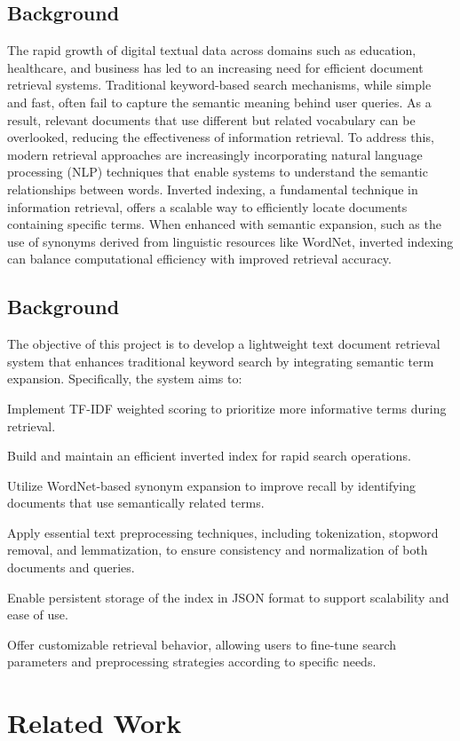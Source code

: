 \documentclass[conference]{IEEEtran}
\begin{document}
\subsection{Background}
The rapid growth of digital textual data across domains such as education, healthcare, and business has led to an increasing need for efficient document retrieval systems. Traditional keyword-based search mechanisms, while simple and fast, often fail to capture the semantic meaning behind user queries. As a result, relevant documents that use different but related vocabulary can be overlooked, reducing the effectiveness of information retrieval. To address this, modern retrieval approaches are increasingly incorporating natural language processing (NLP) techniques that enable systems to understand the semantic relationships between words. Inverted indexing, a fundamental technique in information retrieval, offers a scalable way to efficiently locate documents containing specific terms. When enhanced with semantic expansion, such as the use of synonyms derived from linguistic resources like WordNet, inverted indexing can balance computational efficiency with improved retrieval accuracy.
\subsection{Background}
The objective of this project is to develop a lightweight text document retrieval system that enhances traditional keyword search by integrating semantic term expansion. Specifically, the system aims to:

    Implement TF-IDF weighted scoring to prioritize more informative terms during retrieval.

    Build and maintain an efficient inverted index for rapid search operations.

    Utilize WordNet-based synonym expansion to improve recall by identifying documents that use semantically related terms.

    Apply essential text preprocessing techniques, including tokenization, stopword removal, and lemmatization, to ensure consistency and normalization of both documents and queries.

    Enable persistent storage of the index in JSON format to support scalability and ease of use.

    Offer customizable retrieval behavior, allowing users to fine-tune search parameters and preprocessing strategies according to specific needs.

\section{Related Work}
\end{document}
